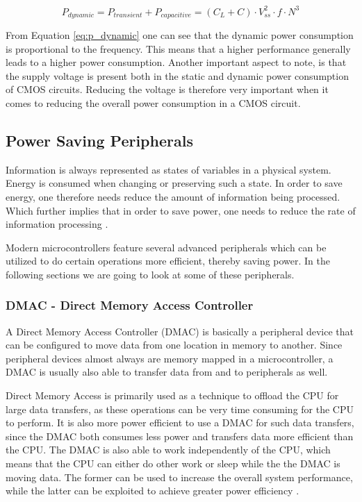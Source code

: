 \begin{equation}
P_{dynamic} = P_{transient} + P_{capacitive} = (C_L + C) \cdot V_{ss}^{2} \cdot f \cdot N^3
\label{eq:p_dynamic}
\end{equation}

From Equation \ref{eq:p_dynamic} one can see that the dynamic power consumption is proportional to the frequency. This means that a higher performance generally leads to a higher power consumption. Another important aspect to note, is that the supply voltage is present both in the static and dynamic power consumption of CMOS circuits. Reducing the voltage is therefore very important when it comes to reducing the overall power consumption in a CMOS circuit.

\subsection{Power Saving Peripherals}

Information is always represented as states of variables in a physical system. Energy is consumed when changing or preserving such a state. In order to save energy, one therefore needs reduce the amount of information being processed. Which further implies that in order to save power, one needs to reduce the rate of information processing \cite{sarpeshkar12}.

Modern microcontrollers feature several advanced peripherals which can be utilized to do certain operations more efficient, thereby saving power. In the following sections we are going to look at some of these peripherals.

\subsubsection{DMAC - Direct Memory Access Controller}

A Direct Memory Access Controller (DMAC) is basically a peripheral device that can be configured to move data from one location in memory to another. Since peripheral devices almost always are memory mapped in a microcontroller, a DMAC is usually also able to transfer data from and to peripherals as well. 

Direct Memory Access is primarily used as a technique to offload the CPU for large data transfers, as these operations can be very time consuming for the CPU to perform. It is also more power efficient to use a DMAC for such data transfers, since the DMAC both consumes less power and transfers data more efficient than the CPU. The DMAC is also able to work independently of the CPU, which means that the CPU can either do other work or sleep while the the DMAC is moving data. The former can be used to increase the overall system performance, while the latter can be exploited to achieve greater power efficiency \cite{ball03}.

